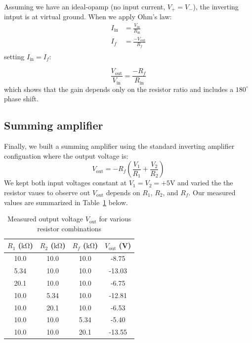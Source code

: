 \documentclass{article}
\begin{document}
\noindent Assuming we have an ideal-opamp (no input current, $V_+=V_-$), the 
inverting intput is at virtual ground. When we apply Ohm's law:
\begin{align}
    I_\text{in}&=\frac{V_\text{in}}{R_\text{in}}\\
    I_f&=\frac{-V_\text{out}}{R_f}\\
\end{align}
\noindent setting $I_\text{in}=I_f$:

\begin{equation}
    \frac{V_\text{out}}{V_\text{in}}=\frac{-R_f}{R_\text{in}}
\end{equation}
\noindent which shows that the gain depends only on the resistor ratio and
includes a $180^\circ$ phase shift.


\subsection{Summing amplifier}

Finally, we built a summing amplifier using the standard inverting amplifier
configuation where the output voltage is:
\begin{equation}
    V_\text{out}=-R_f\left(\frac{V_1}{R_1} + \frac{V_2}{R_2} \right)
\end{equation}
We kept both input voltages constant at $V_1=V_2=+5\si{\volt}$ and varied the
the resistor vaues to observe out $V_\text{out}$ depends on $R_1$, $R_2$, and 
$R_f$. Our measured values are summarized in Table~\ref{tab:sumamp} below.

\begin{table}[H]
    \centering
    \caption{Measured output voltage $V_\text{out}$ for various resistor combinations}
    \begin{tabular}{|c|c|c|c|}
        \hline
        $R_1$ ($\si{\kilo\ohm}$) & $R_2$ ($\si{\kilo\ohm}$) & $R_f$ ($\si{\kilo\ohm}$) & $V_\text{out}$ (V)\\
        \hline
        10.0 & 10.0 & 10.0 & -8.75\\
        5.34 & 10.0 & 10.0 & -13.03\\
        20.1 & 10.0 & 10.0 & -6.75\\
        10.0 & 5.34 & 10.0 & -12.81\\
        10.0 & 20.1 & 10.0 & -6.53\\
        10.0 & 10.0 & 5.34 & -5.40\\
        10.0 & 10.0 & 20.1 & -13.55\\
        \hline
    \end{tabular}
    \label{tab:sumamp}
\end{table}
\end{document}
